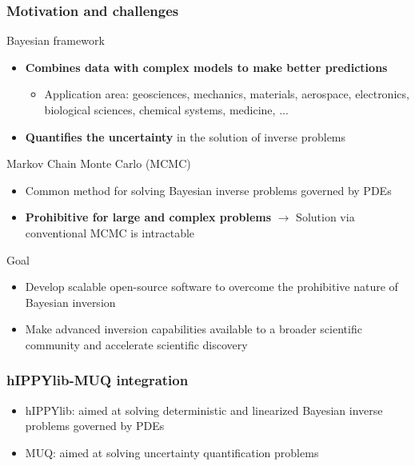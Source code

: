 \documentclass{beamer}
\begin{document}
\begin{frame}[c]
  \frametitle{Motivation and challenges}

  \begin{alertblock}{Bayesian framework}
    \begin{itemize}
      \item {\bf Combines data with complex models to make better predictions}
        \vspace{-0.5cm}
        \begin{itemize}
          \item Application area: geosciences, mechanics,
            materials, aerospace, electronics, biological sciences,
            chemical systems, medicine, ...
        \end{itemize}
      \item {\bf Quantifies the uncertainty} in the solution of inverse
        problems
    \end{itemize}
  \end{alertblock}

  \begin{alertblock}{Markov Chain Monte Carlo (MCMC)}
    \begin{itemize}
      \item Common method for solving Bayesian inverse problems governed by
        PDEs
      \item {\bf Prohibitive for large and complex problems} $\rightarrow$ Solution
          via conventional MCMC is intractable
    \end{itemize}
  \end{alertblock}

  \begin{alertblock}{Goal}
    \begin{itemize}
      \item Develop scalable open-source software to overcome the
        prohibitive nature of Bayesian inversion
      \item Make advanced inversion capabilities available to a broader
        scientific community and accelerate scientific discovery
    \end{itemize}
  \end{alertblock}

\end{frame}

\begin{frame}[c]
  \frametitle{hIPPYlib-MUQ integration}
   \begin{center}
    
  \end{center}

  \begin{itemize}
    \item hIPPYlib: aimed at solving deterministic and linearized Bayesian
      inverse problems governed by PDEs
    \item MUQ: aimed at solving uncertainty quantification problems
  \end{itemize}
\end{frame}
\end{document}
